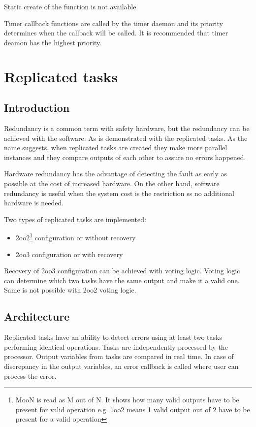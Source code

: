 Static create of the function is not available.

Timer callback functions are called by the timer daemon and its priority determines when the callback will be called. It is recommended that timer deamon has the highest priority.

\section{Replicated tasks}

\subsection{Introduction}

Redundancy is a common term with safety hardware, but the redundancy can be achieved with the software. As is demonstrated with the replicated tasks. As the name suggests, when replicated tasks are created they make more parallel instances and they compare outputs of each other to assure no errors happened. 

Hardware redundancy has the advantage of detecting the fault as early as possible at the cost of increased hardware. On the other hand, software redundancy is useful when the system cost is the restriction ss no additional hardware is needed. 

\noindent Two types of replicated tasks are implemented:
\begin{itemize}
    \item 2oo2\footnote{MooN is read as M out of N. It shows how many valid outputs have to be present for valid operation e.g. 1oo2 means 1 valid output out of 2 have to be present for a valid operation} configuration or without recovery
    \item 2oo3 configuration or with recovery
\end{itemize}

Recovery of 2oo3 configuration can be achieved with voting logic. Voting logic can determine which two tasks have the same output and make it a valid one. Same is not possible with 2oo2 voting logic.


\subsection{Architecture}

Replicated tasks have an ability to detect errors using at least two tasks performing identical operations. Tasks are independently processed by the processor. Output variables from tasks are compared in real time. In case of discrepancy in the output variables, an error callback is called where user can process the error.

